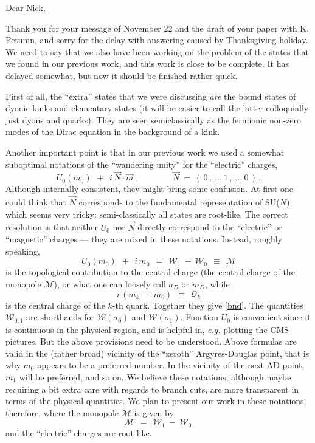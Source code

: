 \documentclass[epsfig,12pt]{article}
\def\beq{\begin{equation}}
\def\eeq{\end{equation}}
\def\beq{\begin{equation}}
\def\eeq{\end{equation}}
\newcommand{\mc}[1]{\mathcal{#1}}
\begin{document}
	\hspace{0.8cm}Dear Nick,

\vspace{0.8cm}
	Thank you for your message of November 22 and the draft of your paper with K. Petunin, 
	and sorry for the delay with answering caused by Thanksgiving holiday.
	We need to say that we also have been working on the problem of the states 
	that we found in our previous work, and this work is close to be complete. 
	It has delayed somewhat, but now it should be finished rather quick.

\vspace{0.8cm}
	First of all, the ``extra'' states that we were discussing {\it are} the bound states 
	of dyonic kinks and elementary states (it will be easier to call the latter colloquially just
	dyons and quarks).
	They are seen semiclassically as the fermionic non-zero modes of the Dirac equation in the
	background of a kink.
	
\vspace{0.8cm}
	Another important point is that in our previous work we used a somewhat suboptimal notations	
	of the ``wandering unity'' for the ``electric'' charges,
\beq
\label{bnd}
	U_0 (m_0) ~~+~~ i\, \vec{N} \cdot \vec{m}\,,\qquad\qquad  \vec{N} ~=~ (\, 0\,,~...~ 1\,,~ ... ~0\, )\,.
\eeq
	Although internally consistent, they might bring some confusion. 
	At first one could think that $ \vec{N} $ corresponds to the fundamental representation
	of SU($N$), which seems very tricky: semi-classically all states are root-like.
	The correct resolution is that neither $ U_0 $ nor $ \vec{N} $ directly correspond to the 
	``electric'' or ``magnetic'' charges --- they are mixed in these notations.
	Instead, roughly speaking,
\beq
\label{M}
 	U_0 (m_0) ~~+~~ i\, m_0  ~~=~~ \mc{W}_1 ~-~ \mc{W}_0  ~~\equiv~~ \mc{M}
\eeq
	is the topological contribution to the central charge (the central charge of the monopole $ \mc{M} $), or what
	one can loosely call $ a_D $ or $ m_D $, while
\beq
\label{q}
	i\, (m_k ~-~ m_0) ~~\equiv~~ \mc{Q}_k
\eeq
	is the central charge of the $ k $-th quark.
	Together they give \eqref{bnd}.
	The quantities $ \mc{W}_{0,1} $ are shorthands for $ \mc{W}(\sigma_0) $ and $ \mc{W}(\sigma_1) $.
	Function $ U_0 $ is convenient since it is continuous in the physical region, and is helpful
	in, {\it e.g.} plotting the CMS pictures.
	But the above provisions need to be understood.
	Above formulas are valid in the (rather broad) vicinity of the ``zeroth'' Argyres-Douglas point,
	that is why $ m_0 $ appears to be a preferred number.
	In the vicinity of the next AD point, $ m_1 $ will be preferred, and so on.
	We believe these notations, although maybe requiring a bit extra care with regards to branch cuts,
	are more transparent in terms of the physical quantities.
	We plan to present our work in these notations, therefore, where the monopole $ \mc{M} $
	is given by
\beq
	\mc{M} ~~=~~ \mc{W}_1 ~-~ \mc{W}_0 \,
\eeq
	and the ``electric'' charges are root-like.
\end{document}
